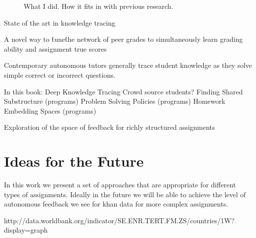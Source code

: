 \begin{figure}[t!]
\center
{}

\caption{
 What I did.
 How it fits in with previous research.
}
\end{figure}



State of the art in knowledge tracing

A novel way to \'tune\' the network of peer grades to simultaneously learn grading ability and assignment true scores

Contemporary autonomous tutors generally trace student knowledge as they solve simple correct or incorrect questions.


In this book:
Deep Knowledge Tracing
Crowd source students?
Finding Shared Substructure (programs)
Problem Solving Policies (programs)
Homework Embedding Spaces (programs)



Exploration of the space of feedback for richly structured assignments

\section{Ideas for the Future}

In this work we present a set of approaches that are appropriate for different types of assignments. Ideally in the future we will be able to achieve the level of autonomous feedback we see for khan data for more complex assignments. 

http://data.worldbank.org/indicator/SE.ENR.TERT.FM.ZS/countries/1W?display=graph